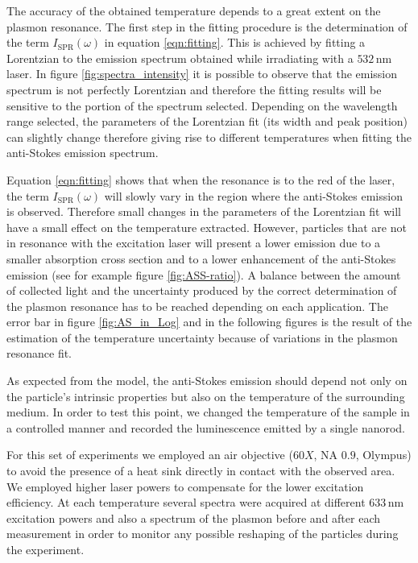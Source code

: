 \documentclass[journal=nalefd,manuscript=letter]{achemso}
\newcommand{\nm}{\ensuremath{\,\textrm{nm}}}
\begin{document}
The accuracy of the obtained temperature depends to a great extent on the
plasmon resonance. The first step in the fitting procedure is the determination
of the term $I_\textrm{SPR}(\omega)$ in equation \ref{eqn:fitting}. This is achieved by
fitting a Lorentzian to the emission spectrum obtained while irradiating with a
$532\nm$ laser. In figure \ref{fig:spectra_intensity} it is possible to observe
that the emission spectrum is not perfectly Lorentzian and therefore the fitting
results will be sensitive to the portion of the spectrum selected. Depending on
the wavelength range selected, the parameters of the Lorentzian fit (its width
and peak position) can slightly change therefore giving rise to different
temperatures when fitting the anti-Stokes emission spectrum.

Equation \ref{eqn:fitting} shows that when the resonance is to the red
of the laser, the term $I_\textrm{SPR}(\omega)$ will slowly vary in the region where the
anti-Stokes emission is observed. Therefore small changes in the parameters of
the Lorentzian fit will have a small effect on the temperature extracted.
However, particles that are not in resonance with the excitation laser will
present a lower emission due to a smaller absorption cross section and to a
lower enhancement of the anti-Stokes emission (see for example figure
\ref{fig:ASS-ratio}). A balance between the amount of collected light and the
uncertainty produced by the correct determination of the plasmon resonance has
to be reached depending on each application. The error bar in figure
\ref{fig:AS_in_Log} and in the following figures is the result of the estimation
of the temperature uncertainty because of variations in the plasmon resonance
fit.

As expected from the model, the anti-Stokes emission should depend not only on
the particle's intrinsic properties but also on the temperature of the
surrounding medium\cite{Konrad2013}. In order to test this point, we changed the
temperature of the sample in a controlled manner and recorded the luminescence
emitted by a single nanorod.

For this set of experiments we employed an air objective ($60X$, NA $0.9$,
Olympus) to avoid the presence of a heat sink directly in contact with the
observed area. We employed higher laser powers to compensate for the lower
excitation efficiency. At each temperature several spectra were acquired at different
$633\nm$ excitation powers and also a spectrum of the plasmon before and after
each measurement in order to monitor any possible reshaping of the particles
during the experiment.
\end{document}

